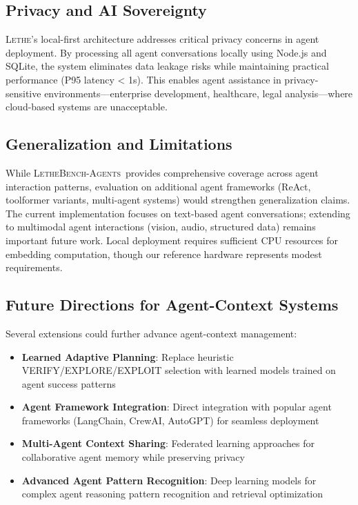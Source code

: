 \documentclass[letterpaper]{article}
\newcommand{\lethe}{\textsc{Lethe}}
\newcommand{\lethebench}{\textsc{LetheBench-Agents}}
\begin{document}
\subsection{Privacy and AI Sovereignty}

\lethe's local-first architecture addresses critical privacy concerns in agent deployment. By processing all agent conversations locally using Node.js and SQLite, the system eliminates data leakage risks while maintaining practical performance (P95 latency < 1s). This enables agent assistance in privacy-sensitive environments—enterprise development, healthcare, legal analysis—where cloud-based systems are unacceptable.

\subsection{Generalization and Limitations}

While \lethebench\ provides comprehensive coverage across agent interaction patterns, evaluation on additional agent frameworks (ReAct, toolformer variants, multi-agent systems) would strengthen generalization claims. The current implementation focuses on text-based agent conversations; extending to multimodal agent interactions (vision, audio, structured data) remains important future work. Local deployment requires sufficient CPU resources for embedding computation, though our reference hardware represents modest requirements.

\subsection{Future Directions for Agent-Context Systems}

Several extensions could further advance agent-context management:

\begin{itemize}
    \item \textbf{Learned Adaptive Planning}: Replace heuristic VERIFY/EXPLORE/EXPLOIT selection with learned models trained on agent success patterns
    \item \textbf{Agent Framework Integration}: Direct integration with popular agent frameworks (LangChain, CrewAI, AutoGPT) for seamless deployment
    \item \textbf{Multi-Agent Context Sharing}: Federated learning approaches for collaborative agent memory while preserving privacy
    \item \textbf{Advanced Agent Pattern Recognition}: Deep learning models for complex agent reasoning pattern recognition and retrieval optimization
\end{itemize}
\end{document}
